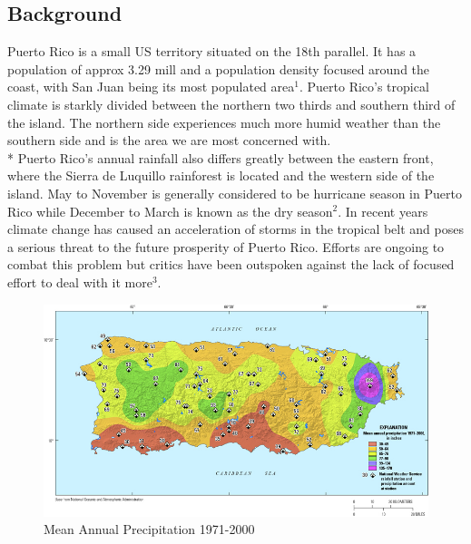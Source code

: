 \documentclass[a4paper,12pt]{article}
\begin{document}
\subsection{Background}
Puerto Rico is a small US territory situated on the 18th parallel. It has a population of approx 3.29 mill and a population density focused around the coast,
with San Juan being its most populated area$^{1}$. Puerto Rico's tropical climate is starkly divided between the northern two thirds and southern third of the island.
The northern side experiences much more humid weather than the southern side and is the area we are most concerned with.\\* Puerto Rico's annual rainfall also differs greatly between the eastern front, where the Sierra de Luquillo rainforest is located and the western side of the island.
May to November is generally considered to be hurricane season in Puerto Rico while December to March is known as the dry season$^{2}$.
In recent years climate change has caused an acceleration of storms in the tropical belt and poses a serious threat to the future prosperity of Puerto Rico. Efforts are ongoing to combat this problem but critics have been outspoken against the lack
of focused effort to deal with it more$^{3}$.
\begin{figure}[h]
\centering
\includegraphics[scale =0.5]{Rainfall}
\caption{Mean Annual Precipitation 1971-2000}
\label{rainfall}
\end{figure}
\end{document}
